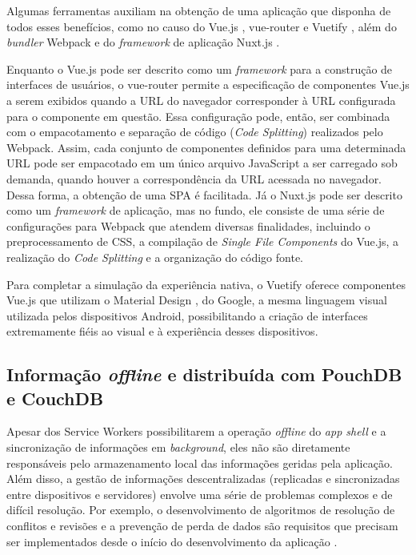 \documentclass[
	article,			%
	11pt,				%
	oneside,			%
	a4paper,			%
	english,			%
	brazil,				%
	sumario=tradicional
	]{abntex2}
\begin{document}
Algumas ferramentas auxiliam na obtenção de uma aplicação que disponha de todos esses benefícios, como no causo do Vue.js \cite{vuejs-2017}, vue-router \cite{vuerouter-2017} e Vuetify \cite{vuetify-2017}, além do \textit{bundler} Webpack \cite{webpack-2017} e do \textit{framework} de aplicação Nuxt.js \cite{nuxt-2017}.

Enquanto o Vue.js pode ser descrito como um \textit{framework} para a construção de interfaces de usuários, o vue-router permite a especificação de componentes Vue.js a serem exibidos quando a URL do navegador corresponder à URL configurada para o componente em questão. Essa configuração pode, então, ser combinada com o empacotamento e separação de código (\textit{Code Splitting}) realizados pelo Webpack. Assim, cada conjunto de componentes definidos para uma determinada URL pode ser empacotado em um único arquivo JavaScript a ser carregado sob demanda, quando houver a correspondência da URL acessada no navegador. Dessa forma, a obtenção de uma SPA é facilitada. Já o Nuxt.js pode ser descrito como um \textit{framework} de aplicação, mas no fundo, ele consiste de uma série de configurações para Webpack que atendem diversas finalidades, incluindo o preprocessamento de CSS, a compilação de \textit{Single File Components} do Vue.js, a realização do \textit{Code Splitting} e a organização do código fonte.

Para completar a simulação da experiência nativa, o Vuetify oferece componentes Vue.js que utilizam o Material Design \cite{material-design-2018}, do Google, a mesma linguagem visual utilizada pelos dispositivos Android, possibilitando a criação de interfaces extremamente fiéis ao visual e à experiência desses dispositivos.

\subsection{Informação \textit{offline} e distribuída com PouchDB e CouchDB}

Apesar dos Service Workers possibilitarem a operação \textit{offline} do \textit{app shell} e a sincronização de informações em \textit{background}, eles não são diretamente responsáveis pelo armazenamento local das informações geridas pela aplicação. Além disso, a gestão de informações descentralizadas (replicadas e sincronizadas entre dispositivos e servidores) envolve uma série de problemas complexos e de difícil resolução. Por exemplo, o desenvolvimento de algoritmos de resolução de conflitos e revisões e a prevenção de perda de dados são requisitos que precisam ser implementados desde o início do desenvolvimento da aplicação \cite{martynus-2017}.
\end{document}
